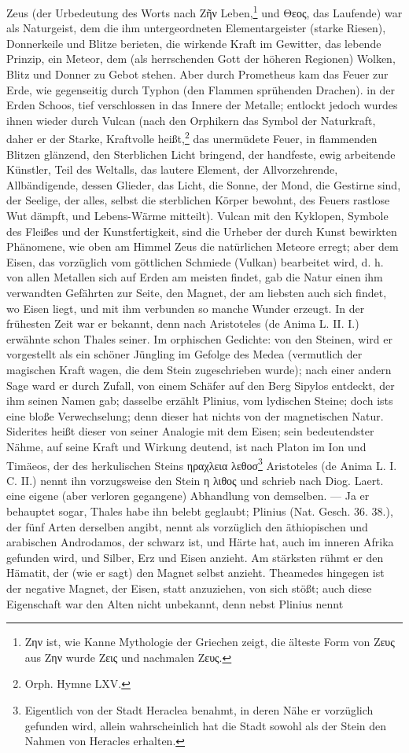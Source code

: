 \documentclass[a4paper, 11pt, oneside, polutonikogreek, german]{article}
\begin{document}
Zeus (der Urbedeutung des Worts nach Ζῆν Leben,\footnote{Ζην ist, wie Kanne Mythologie der Griechen zeigt, die älteste Form von Ζευς aus Ζην wurde Ζεις und nachmalen Ζευς.} und Θεος, das Laufende) war als Naturgeist, dem die ihm untergeordneten Elementargeister (starke Riesen), Donnerkeile und Blitze berieten, die wirkende Kraft im Gewitter, das lebende Prinzip, ein Meteor, dem (als herrschenden Gott der höheren Regionen) Wolken, Blitz und Donner zu Gebot stehen. Aber durch Prometheus kam das Feuer zur Erde, wie gegenseitig durch Typhon (den Flammen sprühenden Drachen). in der Erden Schoos, tief verschlossen in das Innere der Metalle; entlockt jedoch wurdes ihnen wieder durch Vulcan (nach den Orphikern das Symbol der Naturkraft, daher er der Starke, Kraftvolle heißt,\footnote{Orph. Hymne LXV.} das unermüdete Feuer, in flammenden Blitzen glänzend, den Sterblichen Licht bringend, der handfeste, ewig arbeitende Künstler, Teil des Weltalls, das lautere Element, der Allvorzehrende, Allbändigende, dessen Glieder, das Licht, die Sonne, der Mond, die Gestirne sind, der Seelige, der alles, selbst die sterblichen Körper bewohnt, des Feuers rastlose Wut dämpft, und Lebens-Wärme mitteilt). Vulcan mit den Kyklopen, Symbole des Fleißes und der Kunstfertigkeit, sind die Urheber der durch Kunst bewirkten Phänomene, wie oben am Himmel Zeus die natürlichen Meteore erregt; aber dem Eisen, das vorzüglich vom göttlichen Schmiede (Vulkan) bearbeitet wird, d. h. von allen Metallen sich auf Erden am meisten findet, gab die Natur einen ihm verwandten Gefährten zur Seite, den Magnet, der am liebsten auch sich findet, wo Eisen liegt, und mit ihm verbunden so manche Wunder erzeugt. In der frühesten Zeit war er bekannt, denn nach Aristoteles (de Anima L. II. I.) erwähnte schon Thales seiner. Im orphischen Gedichte: von den Steinen, wird er vorgestellt als ein schöner Jüngling im Gefolge des Medea (vermutlich der magischen Kraft wagen, die dem Stein zugeschrieben wurde); nach einer andern Sage ward er durch Zufall, von einem Schäfer auf den Berg Sipylos entdeckt, der ihm seinen Namen gab; dasselbe erzählt Plinius, vom lydischen Steine; doch ists eine bloße Verwechselung; denn dieser hat nichts von der magnetischen Natur. Siderites heißt dieser von seiner Analogie mit dem Eisen; sein bedeutendster Nähme, auf seine Kraft und Wirkung deutend, ist nach Platon im Ion und Timäeos, der des herkulischen Steins ηραχλεια λεθοσ\footnote{Eigentlich von der Stadt Heraclea benahmt, in deren Nähe er vorzüglich gefunden wird, allein wahrscheinlich hat die Stadt sowohl als der Stein den Nahmen von Heracles erhalten.} Aristoteles (de Anima L. I. C. II.) nennt ihn vorzugsweise den Stein η λιθος und schrieb nach Diog. Laert. eine eigene (aber verloren gegangene) Abhandlung von demselben. --- Ja er behauptet sogar, Thales habe ihn belebt geglaubt; Plinius (Nat. Gesch. 36. 38.), der fünf Arten derselben angibt, nennt als vorzüglich den äthiopischen und arabischen Androdamos, der schwarz ist, und Härte hat, auch im inneren Afrika gefunden wird, und Silber, Erz und Eisen anzieht. Am stärksten rühmt er den Hämatit, der (wie er sagt) den Magnet selbst anzieht. Theamedes hingegen ist der negative Magnet, der Eisen, statt anzuziehen, von sich stößt; auch diese Eigenschaft war den Alten nicht unbekannt, denn nebst Plinius nennt 
\end{document}
